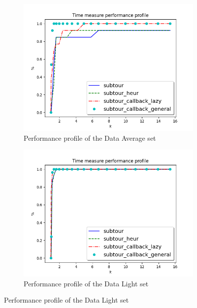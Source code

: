 \begin{figure}[h]
	\begin{subfigure}{.5\textwidth}
		\centering
		\includegraphics[width=\columnwidth]{../res/Lsubtours_average_time.png}
		\caption{Performance profile of the Data Average set}
		\label{fig:res_subtour_av}
	\end{subfigure}
	\begin{subfigure}{.5\textwidth}
	\centering
	\includegraphics[width=\columnwidth]{../res/Lsubtours_light_time.png}
	\caption{Performance profile of the Data Light set}
	\label{fig:res_subtour_li}
	\end{subfigure}
\end{figure}

